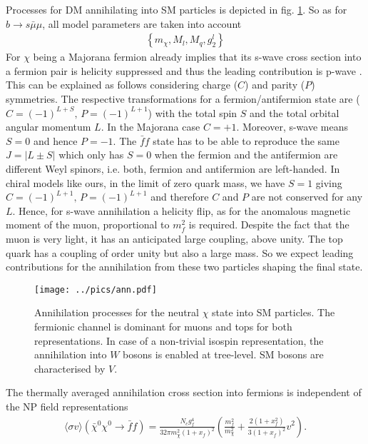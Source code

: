 Processes for DM annihilating into SM particles is depicted in fig. \ref{pic_annihilation}. So as for $b\rightarrow s \bar\mu\mu$, all model parameters are taken into
account
\begin{align}
 \left\{m_\chi, M_l, M_q, g^l_2\right\}
\end{align}
For $\chi$ being a Majorana fermion already implies that its s-wave cross section into a fermion pair is helicity suppressed and 
thus the leading contribution is p-wave \cite{1307.8120}. This can be explained as follows considering charge ($C$) and parity ($P$) symmetries.
The respective transformations for a fermion/antifermion state are ($C=(-1)^{L+S},\,P=(-1)^{L+1}$) with the total spin $S$ and the total orbital angular
momentum $L$. 
In the Majorana case $C=+1$. Moreover, s-wave means $S=0$ and hence $P=-1$. The $\bar f f$ state has to be able to reproduce the same $J=|L\pm S|$ 
which only has $S=0$ when the fermion and the antifermion are different Weyl spinors, i.e. both, fermion and antifermion are left-handed.
In chiral models like ours, in the limit of zero quark mass, we have $S=1$ giving $C=(-1)^{L+1},\,P=(-1)^{L+1}$ and therefore $C$ and $P$ are not 
conserved for any $L$. Hence, for s-wave annihilation a helicity flip, as for the anomalous magnetic moment of the muon, proportional to $m_f^2$ is 
required. Despite the fact that the muon is very light, it has an anticipated large coupling, above unity. The top quark has a coupling of order unity
but also a large mass. So we expect leading contributions for the annihilation from these two particles shaping the final state.
\begin{figure}[t]
 \texttt{[image: ../pics/ann.pdf]}
 \caption{Annihilation processes for the neutral $\chi$ state into SM particles. The fermionic channel is dominant for muons and tops for both 
 representations. In case of a non-trivial isospin representation, the annihilation into $W$ bosons is enabled at tree-level. 
 SM bosons are characterised by $V$.}
 \label{pic_annihilation}
\end{figure}
The thermally averaged annihilation cross section into fermions is independent of the NP field representations \cite{1503.01500}
\begin{align}
 \langle \sigma v \rangle \left(\bar \chi^0 \chi^0 \rightarrow \bar f f\right) = \frac{N_c g_f^4}{32\pi m_\chi^2\left(1+x_f\right)^2} \left(\frac{m_f^2}{m_\chi^2} + \frac{2\left(1+x_f^2\right)}{3\left(1+x_f\right)^2} v^2\right)  .
\end{align}

